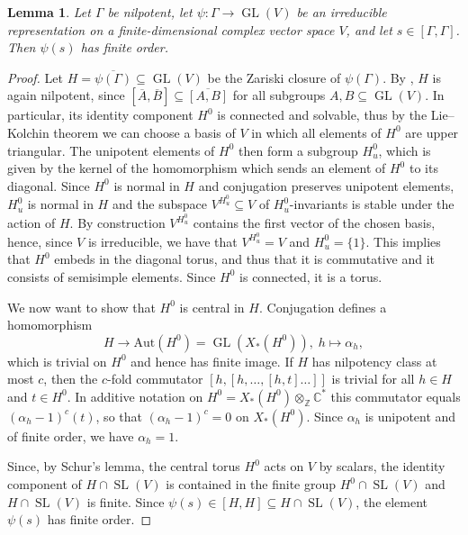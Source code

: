 \documentclass[11pt, a4paper]{amsart}
\newtheorem{lemma}[theorem]{Lemma}
\theoremstyle{definition}
\theoremstyle{myitemstyle}
\newcommand{\Z}{\mathbb{Z}}
\newcommand{\C}{\mathbb{C}}
\DeclareMathOperator{\GL}{GL}
\DeclareMathOperator{\SL}{SL}
\begin{document}
\begin{lemma}
\label{lem:roots of unity}
Let $\Gamma$ be nilpotent, let $\psi\colon \Gamma\to \GL(V)$ be an irreducible representation on a finite-dimensional complex vector space $V$, and let $s\in [\Gamma,\Gamma]$. Then $\psi(s)$ has finite order.
\end{lemma}
\begin{proof}

Let $H=\overline{\psi(\Gamma)}\subseteq\GL(V)$ be the Zariski closure of $\psi(\Gamma)$. By \cite[\S 4.3]{Waterhouse79}, $H$ is again nilpotent, since $[\overline A,\overline B]\subseteq\overline{[A,B]}$ for all subgroups $A,B\subseteq\GL(V)$. In particular, its identity component $H^{0}$ is connected and solvable, thus by the Lie--Kolchin theorem \cite[\S 10.2]{Waterhouse79} we can choose a basis of $V$ in which all elements of $H^0$ are upper triangular. 
The unipotent elements of $H^0$ then form a subgroup $H^0_u$, which is given by the kernel of the homomorphism which sends an element of $H^0$ to its diagonal. Since $H^0$ is normal in $H$ and conjugation preserves unipotent elements, $H^0_u$ is normal in $H$ and the subspace $V^{H^0_u}\subseteq V$ of $H^0_u$-invariants is stable under the action of $H$.
By construction $V^{H^0_u}$ contains the first vector of the chosen basis, hence, since $V$ is irreducible, we have that $V^{H^0_u}=V$ and $H^0_u=\{1\}$. This implies that $H^0$ embeds in the diagonal torus, and thus that it is commutative and it consists of semisimple elements. Since $H^0$ is connected, it is a torus.

We now want to show that $H^0$ is central in $H$. Conjugation defines a homomorphism 
\[
    H\to\mathrm{Aut}(H^0)=\GL(X_*(H^0)),\; h\mapsto\alpha_h,
\]
which is trivial on $H^0$ and hence has finite image.
If $H$ has nilpotency class at most $c$, then the $c$-fold commutator $[h,[h,\dots,[h,t]\dots]]$ is trivial for all $h\in H$ and $t\in H^0$. In additive notation on $H^0=X_*(H^0)\otimes_\Z\C^*$ this commutator equals $(\alpha_h-1)^c(t)$, so that $(\alpha_h-1)^c=0$ on $X_*(H^0)$. Since $\alpha_h$ is unipotent and of finite order, we have $\alpha_h=1$.

Since, by Schur's lemma, the central torus $H^0$ acts on $V$ by scalars, the identity component of $H\cap\SL(V)$ is contained in the finite group $H^0\cap\SL(V)$ and $H\cap\SL(V)$ is finite. Since $\psi(s)\in[H,H]\subseteq H\cap\SL(V)$, the element $\psi(s)$ has finite order.
\end{proof}
\end{document}
